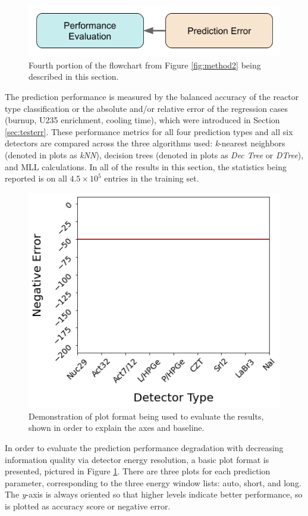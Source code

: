 
\begin{figure}[H]
  \centering
  \includegraphics[width=0.7\linewidth]{./chapters/exp2/methodology2_4.png}
  \caption[Fourth portion of the flowchart from Figure \ref{fig:method2}]
          {Fourth portion of the flowchart from Figure \ref{fig:method2} being 
           described in this section.}
\end{figure}

The prediction performance is measured by the balanced accuracy of the reactor
type classification or the absolute and/or relative error of the regression
cases (burnup, \gls{U235} enrichment, cooling time), which were introduced in
Section \ref{sec:testerr}.  These performance metrics for all four prediction
types and all six detectors are compared across the three algorithms used:
\textit{k}-nearest neighbors (denoted in plots as \textit{kNN}), decision trees
(denoted in plots as \textit{Dec Tree} or \textit{DTree}), and \gls{MLL}
calculations.  In all of the results in this section, the statistics being
reported is on all $4.5 \times 10^5$ entries in the training set.

\begin{figure}[!htb]
  \centering
  \includegraphics[width=0.5\linewidth]{./chapters/exp2/exp2_plot_description.png}
  \caption[Demonstration of plot being used to evaluate the results]
          {Demonstration of plot format being used to evaluate the results, 
           shown in order to explain the axes and baseline.}
  \label{fig:detdemo}
\end{figure}

In order to evaluate the prediction performance degradation with decreasing
information quality via detector energy resolution, a basic plot format is
presented, pictured in Figure \ref{fig:detdemo}.  There are three plots for
each prediction parameter, corresponding to the three energy window lists:
auto, short, and long.  The \textit{y}-axis is always oriented so that higher
levels indicate better performance, so is plotted as accuracy score or negative
error.  

